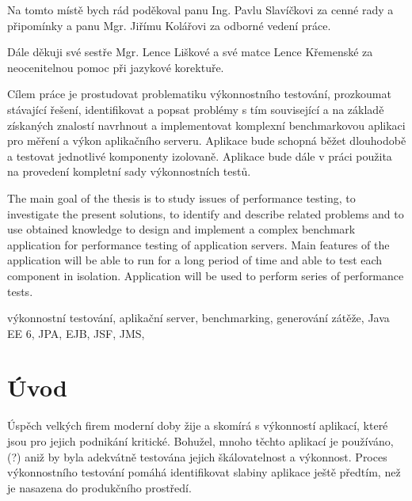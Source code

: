 \documentclass[122pt,oneside]{fithesis}
\begin{document}
\FrontMatter
\ThesisTitlePage

\begin{ThesisDeclaration}
\DeclarationText
\AdvisorName
\end{ThesisDeclaration}

\begin{ThesisThanks}
Na tomto místě bych rád poděkoval panu Ing. Pavlu Slavíčkovi za cenné rady a připomínky a panu Mgr. Jiřímu Kolářovi za odborné vedení práce.

Dále děkuji své sestře Mgr. Lence Liškové a své matce Lence Křemenské za neocenitelnou pomoc při jazykové korektuře. 
\end{ThesisThanks}

\begin{ThesisAbstract}
Cílem práce je prostudovat problematiku výkonnostního testování, prozkoumat stávající řešení, identifikovat a popsat problémy s tím související  a na základě získaných znalostí navrhnout a implementovat komplexní benchmarkovou aplikaci pro měření a výkon aplikačního serveru. Aplikace bude schopná běžet dlouhodobě a testovat jednotlivé komponenty izolovaně. Aplikace bude dále v práci použita na provedení kompletní sady výkonnostních testů.
\end{ThesisAbstract}

\begin{ThesisAbstracten}
The main goal of the thesis is to study issues of performance testing, to investigate the present solutions, to identify and describe related problems and to use obtained knowledge to design and implement a complex benchmark application for performance testing of application servers. Main features of the application will be able to run for a long period of time and able to test each component in isolation. Application will be used to perform series of performance tests.
\end{ThesisAbstracten}

\begin{ThesisKeyWords}
výkonnostní testování, aplikační server, benchmarking, generování zátěže, Java EE 6, JPA, EJB, JSF, JMS, 
\end{ThesisKeyWords}

\MainMatter
\tableofcontents

\chapter*{Úvod}
Úspěch velkých firem moderní doby žije a skomírá s výkonností aplikací, které jsou pro jejich podnikání kritické. Bohužel, mnoho těchto aplikací je používáno,(?) aniž by byla adekvátně testována jejich škálovatelnost a výkonnost. Proces výkonnostního testování pomáhá identifikovat slabiny aplikace ještě předtím, než je nasazena do produkčního prostředí.
\end{document}
